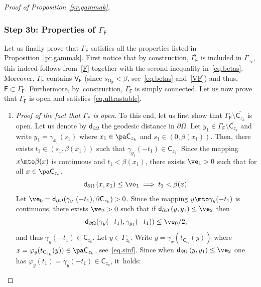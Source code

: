 \begin{proof}[Proof of Proposition~\ref{pr.gammak}]
\subsubsection*{Step 3b: Properties of $ \Gamma_{\mathsf F}$} Let us finally prove that $ \Gamma_{\mathsf F}$ satisfies all the properties listed in Proposition~\ref{pr.gammak}. First notice that by construction, $\overline{ \Gamma_{\mathsf F}}$ is included in $\Gamma_{z_k}$, this indeed follows from~\eqref{F} together with the second inequality in~\eqref{eq.betas}. Moreover, $ \Gamma_{\mathsf F}$ contains $\mathsf V_{\mathsf F}$ (since $s_{\mathsf O_{\mathsf F}}<\beta$, see~\eqref{eq.betas} and~\eqref{VF}) and thus, $\mathsf F\subset \Gamma_{\mathsf F}$. Furthermore, by~construction, $\Gamma_{\mathsf F}$ is simply connected.
Let us now prove that $ \Gamma_{\mathsf F}$ is open and satisfies~\eqref{eq.ultrastable}.
\begin{enumerate}
\item
\emph{Proof of the fact that $ \Gamma_{\mathsf F}$ is open.} To this end, let us first show that $ \Gamma_{\mathsf F}\setminus \overline{ \mathsf C_{z_k}}$ is open.
Let us denote by $\mathsf d_{\partial \Omega}$ the geodesic distance in $\partial \Omega$. Let $y_1\in \Gamma_{\mathsf F}\setminus \overline{ \mathsf C_{z_k}}$
and write $y_1=\gamma_{x_1}(s_1)$ where $x_1\in \pa \mathsf C_{z_k}$ and $s_1\in (0,\beta(x_1))$.
Then, there exists $t_1\in (s_1, \beta(x_1))$ such that $\gamma_{y_1}(-t_1)\in \mathsf C_{z_k}$.
Since the mapping $x\mto \beta(x)$ is continuous and $t_1<\beta(x_1)$, there exists $\ve_1>0$ such that for all $x\in \pa \mathsf C_{z_k}$,
\begin{equation}\label{eq.fitsve}
\mathsf d_{\partial \Omega}\left(x,x_1\right)\leq \ve_1 \implies t_1<\beta(x).
\end{equation}
Let $\ve_0=\mathsf d_{\partial \Omega}(\gamma_{y_1}(-t_1),\partial \mathsf C_{z_k}) >0$.
Since the mapping $y\mto \gamma_y(-t_1)$ is continuous, there exists $\ve_2>0$ such that if $\mathsf d_{\partial \Omega}\left(y,y_1\right)\leq \ve_2$ then
\[
\mathsf d_{\partial \Omega}(\gamma_y(-t_1),\gamma_{y_1}(-t_1))\leq \ve_0/2,
\]
and thus $\gamma_y(-t_1)\in \mathsf C_{z_k}$.
Let $y\in \Gamma_{z_k}$.
Write $y=\gamma_x(t_{\mathsf C_{z_k}}(y))$ where $x= \varphi_{y}(t_{\mathsf C_{z_k}}(y))\in \pa \mathsf C_{z_k}$, see~\eqref{eq.sinf}. Since when $\mathsf d_{\partial \Omega}\left(y,y_1\right)\leq \ve_2$ one has $\varphi_y(t_1)=\gamma_y(-t_1)\in \mathsf C_{z_k}$, it~holds:
\begin{equation}\label{eq.fitsve2}

\end{equation}
\end{enumerate}
\end{proof}
